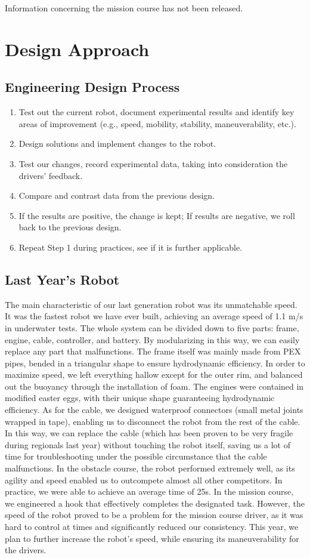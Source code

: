\documentclass[11pt, oneside]{article}   	%
\begin{document}
Information concerning the mission course has not been released.

\section{Design Approach}
\subsection{Engineering Design Process}
\begin{enumerate}
	\item Test out the current robot, document experimental results and identify key areas of improvement (e.g., speed, mobility, stability, maneuverability, etc.).
	\item Design solutions and implement changes to the robot.
	\item Test our changes, record experimental data, taking into consideration the drivers’ feedback.
	\item Compare and contrast data from the previous design.
	\item If the results are positive, the change is kept; If results are negative, we roll back to the previous design.
	\item Repeat Step 1 during practices, see if it is further applicable.
\end{enumerate}

\subsection{Last Year's Robot}
	The main characteristic of our last generation robot was its unmatchable speed. It was the fastest robot we have ever built, achieving an average speed of 1.1 m/s in underwater tests. The whole system can be divided down to five parts: frame, engine, cable, controller, and battery. By modularizing in this way, we can easily replace any part that malfunctions. The frame itself was mainly made from PEX pipes, bended in a triangular shape to ensure hydrodynamic efficiency. In order to maximize speed, we left everything hallow except for the outer rim, and balanced out the buoyancy through the installation of foam. The engines were contained in modified easter eggs, with their unique shape guaranteeing hydrodynamic efficiency. As for the cable, we designed waterproof connectors (small metal joints wrapped in tape), enabling us to disconnect the robot from the rest of the cable. In this way, we can replace the cable (which has been proven to be very fragile during regionals last year) without touching the robot itself, saving us a lot of time for troubleshooting under the possible circumstance that the cable malfunctions.
	In the obstacle course, the robot performed extremely well, as its agility and speed enabled us to outcompete almost all other competitors. In practice, we were able to achieve an average time of 25s. In the mission course, we engineered a hook that effectively completes the designated task. However, the speed of the robot proved to be a problem for the mission course driver, as it was hard to control at times and significantly reduced our consistency. This year, we plan to further increase the robot’s speed, while ensuring its maneuverability for the drivers.
\end{document}
